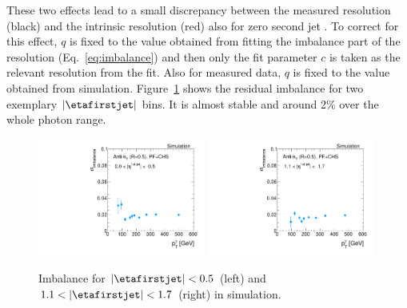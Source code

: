 These two effects lead to a small discrepancy between the measured resolution (black) and the intrinsic resolution (red) also for zero second jet \pt. 
To correct for this effect,  $q$ is fixed to the value obtained 
from fitting the imbalance part of the resolution (Eq.~\eqref{eq:imbalance}) and then only the fit parameter  $c$ is taken as the relevant resolution from the fit.
Also for measured data, $q$ is fixed to the value obtained from simulation. 
Figure~\ref{fig:ImbalanceOfPtgamma} shows the residual imbalance for two exemplary $|\etafirstjet|$ bins. 
It is almost stable and around 2\% over the whole photon \pt range.
\begin{figure}[b]
  \centering
    \includegraphics[width=0.49\textwidth]{figures/resolution/methodology/Imbalance_for_1_eta_bin_PFCHS_mc_RMS99.pdf}
    \includegraphics[width=0.49\textwidth]{figures/resolution/methodology/Imbalance_for_3_eta_bin_PFCHS_mc_RMS99.pdf}
  \caption{Imbalance for $|\etafirstjet| < 0.5$ (left) and $1.1<|\etafirstjet| < 1.7$ (right) in simulation.}  
  \label{fig:ImbalanceOfPtgamma}
\end{figure}

